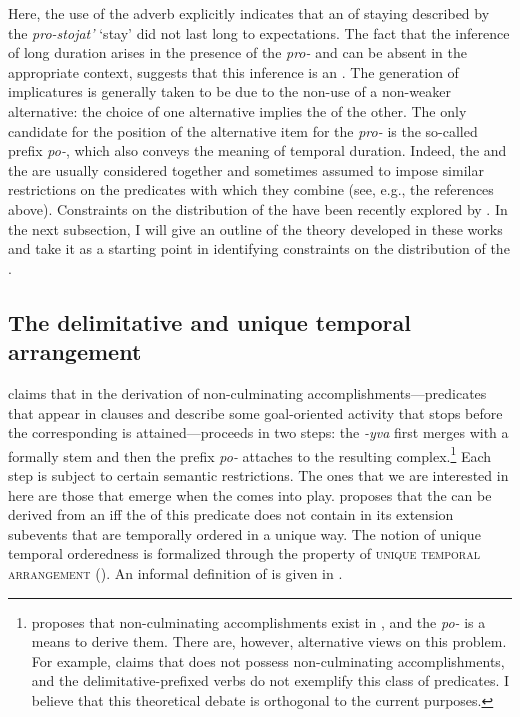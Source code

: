 \documentclass[output=paper,colorlinks,citecolor=brown,newtxmath]{langsci/langscibook}
\begin{document}
\noindent Here, the use of the adverb explicitly indicates that an  of staying described by the   \textit{pro-stojat’} `stay' did not last long  to expectations. The fact that the inference of long duration arises in the presence of the  \textit{pro-} and can be absent in the appropriate context, suggests that this inference is an . The generation of implicatures is generally taken to be due to the non-use of a non-weaker alternative: the choice of one alternative implies the  of the other. The only candidate for the position of the alternative item for the  \textit{pro-} is the so-called  prefix \textit{po-}, which also conveys the meaning of temporal duration. Indeed, the  and the  are usually considered together and sometimes assumed to impose similar restrictions on the predicates with which they combine (see, e.g., the references above). Constraints on the distribution of the  have been recently explored by \citet{tatevosov2017temporal}. In the next subsection, I will give an outline of the theory developed in these works and take it as a starting point in identifying constraints on the distribution of the .

\subsection{The delimitative and unique temporal arrangement} \label{sec:naumov:3.3}

\citet{tatevosov2017temporal} claims that in  the derivation of non-culminating accom\-plish\-ments—predicates that appear in  clauses and describe some goal-oriented activity that stops before the corresponding  is attained—proceeds in two steps: the  \textit{-yva} first merges with a formally  stem and then the  prefix \textit{po-} attaches to the resulting complex.\footnote{\citet{tatevosov2017temporal} proposes that non-culminating accomplishments exist in , and the  \textit{po-} is a means to derive them. There are, however, alternative views on this problem. For example, \citet{martin2017non} claims that  does not possess non-culminating accomplishments, and the delimitative-prefixed verbs do not exemplify this class of predicates. I believe that this theoretical debate is orthogonal to the current purposes.} Each step is subject to certain semantic restrictions. The ones that we are interested in here are those that emerge when the  comes into play. \citet{tatevosov2017temporal} proposes that the  can be derived from an  iff the  of this predicate does not contain in its extension subevents that are temporally ordered in a unique way. The notion of unique temporal orderedness is formalized through the property of \textsc{unique temporal arrangement} (). An informal definition of  is given in .
\end{document}
